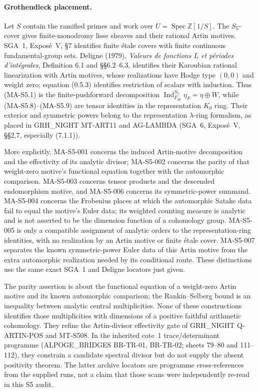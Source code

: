 \paragraph{Grothendieck placement.}
Let $S$ contain the ramified primes and work over
$U=\operatorname{Spec}\mathbb Z[1/S]$. The $S_5$-cover gives
finite-monodromy lisse sheaves and their rational Artin motives.
SGA~1, Expos\'e~V, \S7 identifies finite \'etale covers with finite
continuous fundamental-group sets. Deligne (1979),
\emph{Valeurs de fonctions $L$ et p\'eriodes d'int\'egrales},
Definition 6.1 and \S\S6.2--6.3, identifies their Karoubian
rational linearization with Artin motives, whose realizations
have Hodge type $(0,0)$ and weight zero; equation (0.5.3) identifies
restriction of scalars with induction. Thus (MA-S5.1) is the
finite-pushforward decomposition $\operatorname{Ind}_{F_{20}}^{S_5}
\eta_F=\eta\oplus W$, while (MA-S5.8)--(MA-S5.9) are tensor
identities in the representation $K_0$ ring. Their exterior and
symmetric powers belong to the representation $\lambda$-ring
formalism, as placed in GRH\_NIGHT MT-ART11 and AG-LAMBDA
(SGA~6, Expos\'e~V, \S\S2,7, especially (7.1.1)).

More explicitly, MA-S5-001 concerns the induced Artin-motive
decomposition and the effectivity of its analytic divisor;
MA-S5-002 concerns the parity of that weight-zero motive's
functional equation together with the automorphic comparison.
MA-S5-003 concerns tensor products and the descended
endomorphism motive, and MA-S5-006 concerns its symmetric-power
summand. MA-S5-004 concerns the Frobenius places at which the
automorphic Satake data fail to equal the motive's Euler data;
its weighted counting measure is analytic and is not asserted
to be the dimension function of a cohomology group.
MA-S5-005 is only a compatible assignment of analytic orders
to the representation-ring identities, with no realization by
an Artin motive or finite \'etale cover. MA-S5-007 separates the
known symmetric-power Euler data of this Artin motive from the
extra automorphic realization needed by its conditional route.
These distinctions use
the same exact SGA~1 and Deligne locators just given.

The parity assertion is about the functional equation of a
weight-zero Artin motive and its known automorphic comparison;
the Rankin--Selberg bound is an inequality between analytic
central multiplicities. None of these constructions identifies
those multiplicities with dimensions of a positive faithful
arithmetic cohomology. They refine the Artin-divisor effectivity
gate of GRH\_NIGHT Q-ARTIN-POS and MT-S508. In the inherited
cote~1 trace/determinant programme (ALPOGE\_BRIDGES BR-TR-01,
BR-TR-02; sheets 79--80 and 111--112), they constrain a candidate
spectral divisor but do not supply the absent positivity theorem.
The latter archive locators are programme cross-references from
the supplied runs, not a claim that those scans were independently
re-read in this S5 audit.

